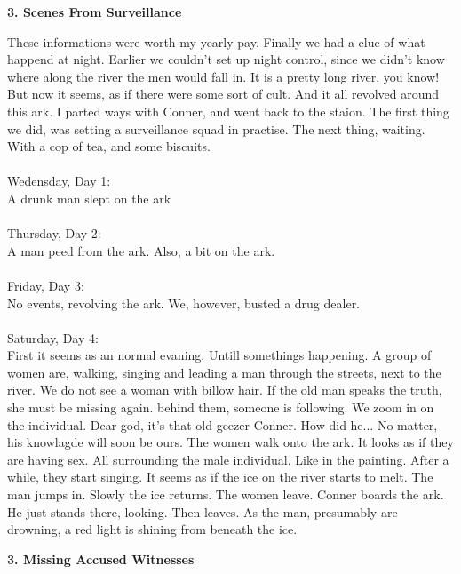 \documentclass[]{article}
\begin{document}
\newpage 

\begin{center}
	\large\textbf{3. Scenes From Surveillance}
\end{center}

These informations were worth my yearly pay. Finally we had a clue of what happend at night. Earlier we couldn't set up night control, since we didn't know where along the river the men would fall in. It is a pretty long river, you know! But now it seems, as if there were some sort of cult. And it all revolved around this ark. I parted ways with Conner, and went back to the staion. The first thing we did, was setting a surveillance squad in practise. The next thing, waiting. With a cop of tea, and some biscuits.
\\ \\
Wedensday, Day 1: 
\\
A drunk man slept on the ark
\\ \\
Thursday, Day 2: 
\\
A man peed from the ark. Also, a bit on the ark.
\\ \\
Friday, Day  3: 
\\
No events, revolving the ark. We, however, busted a drug dealer.
\\ \\
Saturday, Day 4:
\\
First it seems as an normal evaning. Untill somethings happening. A group of women are, walking, singing and leading a man through the streets, next to the river. We do not see a woman with billow hair. If the old man speaks the truth, she must be missing again. behind them, someone is following. We zoom in on the individual. Dear god, it's that old geezer Conner. How did he... No matter, his knowlagde will soon be ours. The women walk onto the ark. It looks as if they are having sex. All surrounding the male individual. Like in the painting. After a while, they start singing. It seems as if the ice on the river starts to melt. The man jumps in. Slowly the ice returns. The women leave. Conner boards the ark. He just stands there, looking. Then leaves. As the man, presumably are drowning, a red light is shining from beneath the ice. 

\newpage

\begin{center}
	\large\textbf{3. Missing Accused Witnesses}
\end{center}
\end{document}
